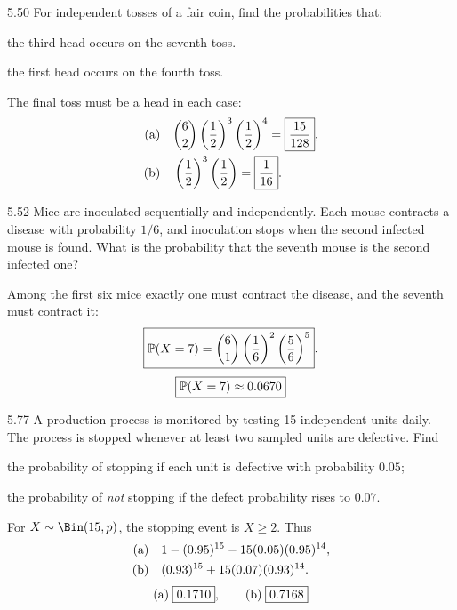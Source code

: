 \documentclass[11pt,oneside]{article}
\begin{document}
\begin{exercise}{5.50}
For independent tosses of a fair coin, find the probabilities that:
\begin{exercisesubparts}
\item the third head occurs on the seventh toss.
\item the first head occurs on the fourth toss.
\end{exercisesubparts}
\end{exercise}

\begin{solution}
The final toss must be a head in each case:
\begin{align*}
\textup{(a)}\quad&\binom{6}{2}\left(\frac12\right)^3\left(\frac12\right)^4=\boxed{\frac{15}{128}},\\
\textup{(b)}\quad&\left(\frac12\right)^3\left(\frac12\right)=\boxed{\frac1{16}}.
\end{align*}
\end{solution}

\begin{exercise}{5.52}
Mice are inoculated sequentially and independently. Each mouse contracts a disease with probability $1/6$, and inoculation stops when the second infected mouse is found. What is the probability that the seventh mouse is the second infected one?
\end{exercise}

\begin{solution}
Among the first six mice exactly one must contract the disease, and the seventh must contract it:
\[
\boxed{\mathbb{P}(X=7)=\binom{6}{1}\left(\frac16\right)^2\left(\frac56\right)^5}.
\]
\[
\boxed{\mathbb{P}(X=7)\approx 0.0670}
\]
\end{solution}

\begin{exercise}{5.77}
A production process is monitored by testing 15 independent units daily. The process is stopped whenever at least two sampled units are defective. Find
\par
\begin{exercisesubparts}
\item the probability of stopping if each unit is defective with probability $0.05$;
\item the probability of \emph{not} stopping if the defect probability rises to $0.07$.
\end{exercisesubparts}
\end{exercise}

\begin{solution}
For $X\sim\Bin(15,p)$, the stopping event is $X\ge2$. Thus
\begin{align*}
\textup{(a)}\quad&1-(0.95)^{15}-15(0.05)(0.95)^{14},\\
\textup{(b)}\quad&(0.93)^{15}+15(0.07)(0.93)^{14}.
\end{align*}
\[
\textup{(a)}\;\boxed{0.1710},\qquad \textup{(b)}\;\boxed{0.7168}
\]
\end{solution}
\end{document}
